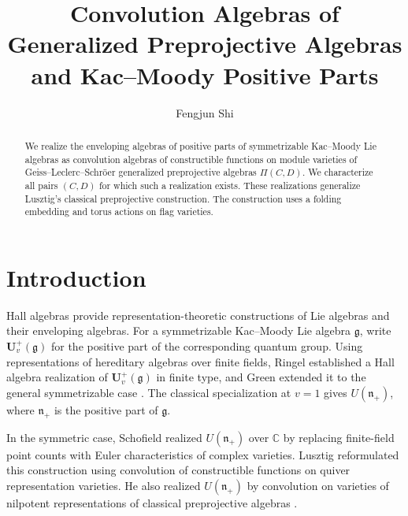 \documentclass[12pt,reqno]{amsart}
\title[Generalized Preprojective Convolution Algebras]
{Convolution Algebras of Generalized Preprojective Algebras and Kac--Moody Positive Parts}
\author{Fengjun Shi}
\date{}
\numberwithin{equation}{section}
\theoremstyle{definition}
\theoremstyle{remark}
\newcommand{\C}{\mathbb C}
\newcommand{\nplus}{\mathfrak n_+}
\newcommand{\g}{\mathfrak g}
\theoremstyle{plain}
\theoremstyle{plain}
\begin{document}
\begin{abstract}
We realize the enveloping algebras of positive parts of symmetrizable Kac--Moody Lie algebras as convolution algebras of constructible functions on module varieties of Geiss--Leclerc--Schr\"oer generalized preprojective algebras $\Pi(C,D)$.
We characterize all pairs $(C,D)$ for which such a realization exists.
These realizations generalize Lusztig's classical preprojective construction.
The construction uses a folding embedding and torus actions on flag varieties.
\end{abstract}

    \maketitle
    \setcounter{tocdepth}{1}
    \tableofcontents

\section{Introduction}\label{sec:introduction}
Hall algebras provide representation-theoretic constructions of Lie algebras and their enveloping algebras. For a symmetrizable Kac--Moody Lie algebra $\mathfrak g$, write $\mathbf{U}_v^+(\g)$ for the positive part of the corresponding quantum group. Using representations of hereditary algebras over finite fields, Ringel established a Hall algebra realization of $\mathbf U_v^+(\g)$ in finite type, and Green extended it to the general symmetrizable case \cite{Rin90,Gr95}. The classical specialization at $v=1$ gives $U(\nplus)$, where $\nplus$ is the positive part of $\mathfrak g$.

In the symmetric case, Schofield \cite{Sch91} realized $U(\nplus)$ over $\C$ by replacing finite-field point counts with Euler characteristics of complex varieties. Lusztig \cite{Lus91} reformulated this construction using convolution of constructible functions on quiver representation varieties. He also realized $U(\nplus)$ by convolution on varieties of nilpotent representations of classical preprojective algebras \cite{Lus91,Lus00}.
\end{document}
